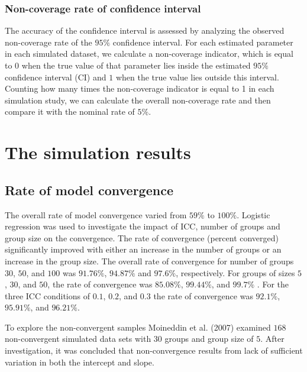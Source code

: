 \documentclass[12pt,oneside,a4paper]{reedthesis}
\begin{document}
\hypertarget{non-coverage-rate-of-confidence-interval}{%
\subsection{Non-coverage rate of confidence interval}\label{non-coverage-rate-of-confidence-interval}}

The accuracy of the confidence interval is assessed by analyzing the observed non-coverage rate of the \(95\%\) confidence interval. For each estimated parameter in each simulated dataset, we calculate a non-coverage indicator, which is equal to \(0\) when the true value of that parameter lies inside the estimated \(95\%\) confidence interval (CI) and \(1\) when the true value lies outside this interval. Counting how many times the non-coverage indicator is equal to 1 in each simulation study, we can calculate the overall non-coverage rate and then compare it with the nominal rate of \(5\%\).

\hypertarget{simulation-results}{%
\chapter{The simulation results}\label{simulation-results}}

\hypertarget{rate-of-model-convergence}{%
\section{Rate of model convergence}\label{rate-of-model-convergence}}

The overall rate of model convergence varied from \(59\%\) to \(100\%\). Logistic regression was used to investigate the impact of ICC, number of groups and group size on the convergence. The rate of convergence (percent converged) significantly improved with either an increase in the number of groups or an increase in the group size. The overall rate of convergence for number of groups \(30\), \(50\), and \(100\) was \(91.76\%\), \(94.87\%\) and \(97.6\%\), respectively. For groups of sizes \(5\), \(30\), and \(50\), the rate of convergence was \(85.08\%\), \(99.44\%\), and \(99.7\%\) . For the three ICC conditions of \(0.1\), \(0.2\), and \(0.3\) the rate of convergence was \(92.1\%\), \(95.91\%\), and \(96.21\%\).

To explore the non-convergent samples Moineddin et al. (2007) examined \(168\) non-convergent simulated data sets with \(30\) groups and group size of \(5\). After investigation, it was concluded that non-convergence results from lack of sufficient variation in both the intercept and slope.
\end{document}
